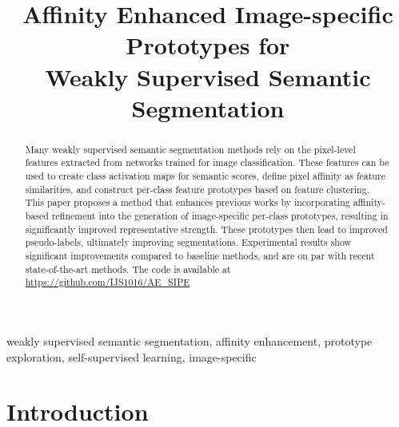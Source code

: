 \documentclass{article}
\title{Affinity Enhanced Image-specific Prototypes for \\Weakly Supervised Semantic Segmentation}
\begin{document}
%
\maketitle
%
\begin{abstract} 
Many weakly supervised semantic segmentation methods rely on the pixel-level features extracted from networks trained for image classification. 
These features can be used to create class activation maps for semantic scores, define pixel affinity as feature similarities, and construct per-class feature prototypes based on feature clustering. 
This paper proposes a method that enhances previous works by incorporating affinity-based refinement into the generation of image-specific per-class prototypes, resulting in significantly improved representative strength. 
These prototypes then lead to improved pseudo-labels, ultimately improving segmentations. 
Experimental results show significant improvements compared to baseline methods, and are on par with recent state-of-the-art methods.
The code is available at \href{https://github.com/IJS1016/AE_SIPE}{\url{https://github.com/IJS1016/AE_SIPE}}

\end{abstract}
%
\begin{keywords}
weakly supervised semantic segmentation, affinity enhancement, prototype exploration, self-supervised learning, image-specific
\end{keywords}
%
\section{Introduction}
\label{sec:intro}
\end{document}
